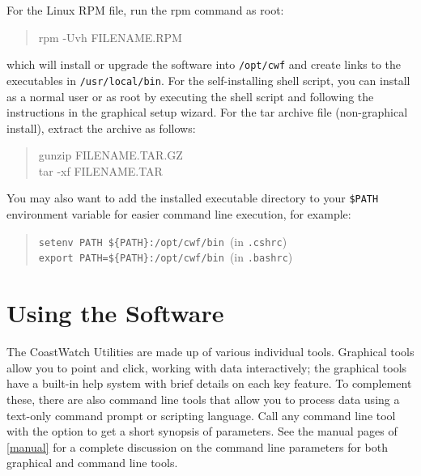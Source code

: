 For the Linux RPM file, run the rpm command as root:
\begin{quote}
  {\file rpm -Uvh} FILENAME.RPM
\end{quote}
which will install or upgrade the software into {\tt /opt/cwf} and create
links to the executables in {\tt /usr/local/bin}. For 
the self-installing shell script, you can
install as a normal user or as root by executing the shell script
and following the instructions in the graphical setup wizard.
For the tar archive file (non-graphical install),
extract the archive as follows:
\begin{quote}
  {\file gunzip} FILENAME.TAR.GZ \\
  {\file tar -xf} FILENAME.TAR
\end{quote}
You may also want to add the installed executable directory to
your {\tt \$PATH} environment variable for easier command line
execution, for example:
\begin{quote}
  {\tt setenv PATH \$\{PATH\}:/opt/cwf/bin}~(in {\tt .cshrc}) \\
  {\tt export PATH=\$\{PATH\}:/opt/cwf/bin}~(in {\tt .bashrc})
\end{quote}

\section{Using the Software}

The CoastWatch Utilities are made up of various individual tools.
Graphical tools allow you to point and click, working with data
interactively; the graphical tools have a built-in help system
with brief details on each key feature.  To complement these,
there are also command line tools that allow you to process data
using a text-only command prompt or scripting language.  Call any
command line tool with the  option to get a
short synopsis of parameters.  See the manual pages of
\autoref{manual} for a complete discussion on the command line
parameters for both graphical and command line tools.

